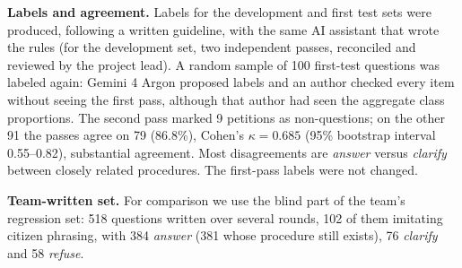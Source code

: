 \textbf{Labels and agreement.} Labels for the development and first test sets were produced, following a written guideline, with the
same AI assistant that wrote the rules (for the development set, two independent passes, reconciled and reviewed by the project lead). A random sample of 100 first-test questions was labeled
again: Gemini 4 Argon proposed labels and an author checked every item without seeing the first pass, although that author had seen the
aggregate class proportions. The second pass marked 9 petitions as non-questions; on the other 91 the passes agree on 79 (86.8\%), Cohen's
$\kappa=0.685$\cite{cohen1960} (95\% bootstrap interval 0.55--0.82), substantial agreement\cite{landis1977}. Most disagreements are
\emph{answer} versus \emph{clarify} between closely related procedures. The first-pass labels were not changed.

\textbf{Team-written set.} For comparison we use the blind part of the team's regression set: 518 questions written over several rounds,
102 of them imitating citizen phrasing, with 384 \emph{answer} (381 whose procedure still exists), 76 \emph{clarify} and 58 \emph{refuse}.
